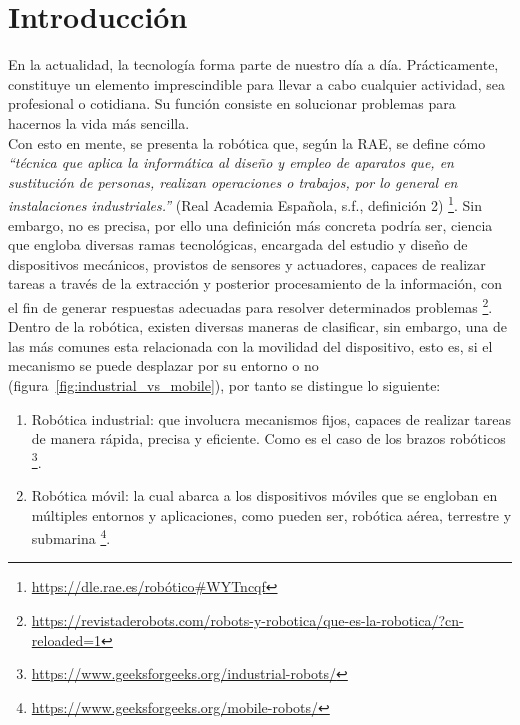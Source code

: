 \chapter{Introducción}
\label{cap:capitulo1}
\setcounter{page}{1}

En la actualidad, la tecnología forma parte de nuestro día a día. Prácticamente, constituye un elemento imprescindible para llevar a cabo cualquier actividad, sea profesional o cotidiana. Su función consiste en solucionar problemas para hacernos la vida más sencilla.\\

Con esto en mente, se presenta la robótica que, según la \ac{RAE}, se define cómo \emph{``técnica que aplica la informática al diseño y empleo de aparatos que, en sustitución de personas, realizan operaciones o trabajos, por lo general en instalaciones industriales.''} (Real Academia Española, s.f., definición 2) \footnote[1]{\href{https://dle.rae.es/rob\%C3\%B3tico\#WYTncqf}{https://dle.rae.es/robótico\#WYTncqf}}. Sin embargo, no es precisa, por ello una definición más concreta podría ser, ciencia que engloba diversas ramas tecnológicas, encargada del estudio y diseño de dispositivos mecánicos, provistos de sensores y actuadores, capaces de realizar tareas a través de la extracción y posterior procesamiento de la información, con el fin de generar respuestas adecuadas para resolver determinados problemas \footnote[2]{\url{https://revistaderobots.com/robots-y-robotica/que-es-la-robotica/?cn-reloaded=1}}.\\

Dentro de la robótica, existen diversas maneras de clasificar, sin embargo, una de las más comunes esta relacionada con la movilidad del dispositivo, esto es, si el mecanismo se puede desplazar por su entorno o no (figura~\ref{fig:industrial_vs_mobile}), por tanto se distingue lo siguiente:

\begin{enumerate}
	\item Robótica industrial: que involucra mecanismos fijos, capaces de realizar tareas de manera rápida, precisa y eficiente. Como es el caso de los brazos robóticos \footnote[3]{\url{https://www.geeksforgeeks.org/industrial-robots/}}.
	\item Robótica móvil: la cual abarca a los dispositivos móviles que se engloban en múltiples entornos y aplicaciones, como pueden ser, robótica aérea, terrestre y submarina \footnote[4]{\url{https://www.geeksforgeeks.org/mobile-robots/}}.
\end{enumerate}

